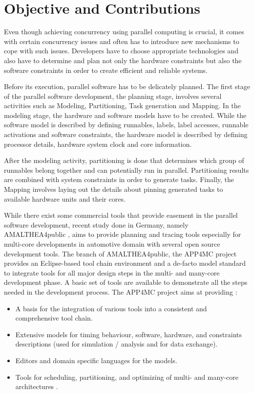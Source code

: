 \section{Objective and Contributions}
Even though achieving concurrency using parallel computing is crucial, it comes with certain concurrency issues and often has to introduce new mechanisms to cope with such issues.
Developers have to choose appropriate technologies and also have to determine and plan not only the hardware constraints but also the software constraints in order to create efficient and reliable systems.

Before its execution, parallel software has to be delicately planned. The first stage of the parallel software development, the planning stage, involves several activities such as Modeling, Partitioning, Task generation and Mapping. In the modeling stage, the hardware and software models have to be created. While the software model is described by defining runnables, labels, label accesses, runnable activations and software constraints, the hardware model is described by defining processor details, hardware system clock and core information.

After the modeling activity, partitioning is done that determines which group of runnables belong together and can potentially run in parallel. Partitioning results are combined with system constraints in order to generate tasks. Finally, the Mapping involves laying out the details about pinning generated tasks to available hardware units and their cores.

While there exist some commercial tools that provide easement in the parallel software development, recent study done in Germany, namely AMALTHEA4public \cite{ICPDSSE} \cite{amalthea4publicweb}, aims to provide planning and tracing tools especially for multi-core developments in automotive domain with several open source development tools. The branch of AMALTHEA4public, the APP4MC project \cite{app4mcproposaleclipse} provides an Eclipse-based tool chain environment and a de-facto model standard to integrate tools for all major design steps in the multi- and many-core development phase. A basic set of tools are available to demonstrate all the steps needed in the development process. The APP4MC project aims at providing \cite{app4mcproposaleclipse}:

\begin{itemize}
	\item A basis for the integration of various tools into a consistent and comprehensive tool chain.
	\item Extensive models for timing behaviour, software, hardware, and constraints descriptions (used for simulation / analysis and for data exchange).
	\item Editors and domain specific languages for the models.
	\item Tools for scheduling, partitioning, and optimizing of multi- and many-core architectures \cite{app4mcproposaleclipse}.
\end{itemize}

